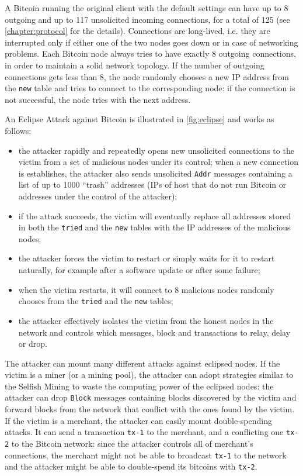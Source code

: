 A Bitcoin running the original client \cite{bitcoin_github} with the default settings can have up to \num{8} outgoing and up to \num{117} unsolicited incoming connections, for a total of \num{125} \cite{deanonymisation_2014, eclipse_attack_2015} (see \cref{chapter:protocol} for the details).
Connections are long-lived, i.e. they are interrupted only if either one of the two nodes goes down or in case of networking problems.
Each Bitcoin node always tries to have exactly \num{8} outgoing connections, in order to maintain a solid network topology.
If the number of outgoing connections gets less than \num{8}, the node randomly chooses a new IP address from the \texttt{new} table and tries to connect to the corresponding node:
if the connection is not successful, the node tries with the next address.

\medskip
An Eclipse Attack against Bitcoin \cite{eclipse_attack_2015} is illustrated in \cref{fig:eclipse} and works as follows:
\begin{itemize}
	\item the attacker rapidly and repeatedly opens new unsolicited connections to the victim from a set of malicious nodes under its control; when a new connection is establishes, the attacker also sends unsolicited \texttt{Addr} messages containing a list of up to \num{1000} ``trash'' addresses (IPs of host that do not run Bitcoin or addresses under the control of the attacker);
	\item if the attack succeeds, the victim will eventually replace all addresses stored in both the \texttt{tried} and the \texttt{new} tables with the IP addresses of the malicious nodes;
	\item the attacker forces the victim to restart \cite{cve_bloom_filter_2013, bitcoin_common_vulnerabilities} or simply waits for it to restart naturally, for example after a software update or after some failure;
	\item when the victim restarts, it will connect to \num{8} malicious nodes randomly chooses from the \texttt{tried} and the \texttt{new} tables;
	\item the attacker effectively isolates the victim from the honest nodes in the network and controls which messages, block and transactions to relay, delay or drop.
\end{itemize}

The attacker can mount many different attacks against eclipsed nodes.
If the victim is a miner (or a mining pool), the attacker can adopt strategies similar to the Selfish Mining to waste the computing power of the eclipsed nodes:
the attacker can drop \texttt{Block} messages containing blocks discovered by the victim and forward blocks from the network that conflict with the ones found by the victim.
If the victim is a merchant, the attacker can easily mount double-spending attacks.
It can send a transaction \texttt{tx-1} to the merchant, and a conflicting one \texttt{tx-2} to the Bitcoin network:
since the attacker controls all of merchant's connections, the merchant might not be able to broadcast \texttt{tx-1} to the network and the attacker might be able to double-spend its bitcoins with \texttt{tx-2}.


